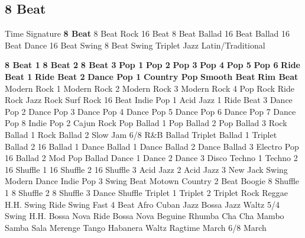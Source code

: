 \subsection{8 Beat}
Time Signature
\textbf{8 Beat}
8 Beat Rock
16 Beat
8 Beat Ballad
16 Beat Ballad
16 Beat Dance
16 Beat Swing
8 Beat Swing
Triplet
Jazz
Latin/Traditional





























\textbf{8 Beat 1}
\textbf{8 Beat 2}
\textbf{8 Beat 3}
\textbf{Pop 1}
\textbf{Pop 2}
\textbf{Pop 3}
\textbf{Pop 4}
\textbf{Pop 5}
\textbf{Pop 6}
\textbf{Ride Beat 1}
\textbf{Ride Beat 2}
\textbf{Dance Pop 1}
\textbf{Country Pop}
\textbf{Smooth Beat}
\textbf{Rim Beat}
Modern Rock 1
Modern Rock 2
Modern Rock 3
Modern Rock 4
Pop Rock
Ride Rock
Jazz Rock
Surf Rock
16 Beat
Indie Pop 1
Acid Jazz 1
Ride Beat 3
Dance Pop 2
Dance Pop 3
Dance Pop 4
Dance Pop 5
Dance Pop 6
Dance Pop 7
Dance Pop 8
Indie Pop 2
Cajun Rock
Pop Ballad 1
Pop Ballad 2
Pop Ballad 3
Rock Ballad 1
Rock Ballad 2
Slow Jam
6/8 R\&B Ballad
Triplet Ballad 1
Triplet Ballad 2
16 Ballad 1
Dance Ballad 1
Dance Ballad 2
Dance Ballad 3
Electro Pop
16 Ballad 2
Mod Pop Ballad
Dance 1
Dance 2
Dance 3
Disco
Techno 1
Techno 2
16 Shuffle 1
16 Shuffle 2
16 Shuffle 3
Acid Jazz 2
Acid Jazz 3
New Jack Swing
Modern Dance
Indie Pop 3
Swing Beat
Motown
Country 2 Beat
Boogie
8 Shuffle 1
8 Shuffle 2
8 Shuffle 3
Dance Shuffle
Triplet 1
Triplet 2
Triplet Rock
Reggae
H.H. Swing
Ride Swing
Fast 4 Beat
Afro Cuban
Jazz Bossa
Jazz Waltz
5/4 Swing
H.H. Bossa Nova
Ride Bossa Nova
Beguine
Rhumba
Cha Cha
Mambo
Samba
Sala
Merenge
Tango
Habanera
Waltz
Ragtime
March
6/8 March
